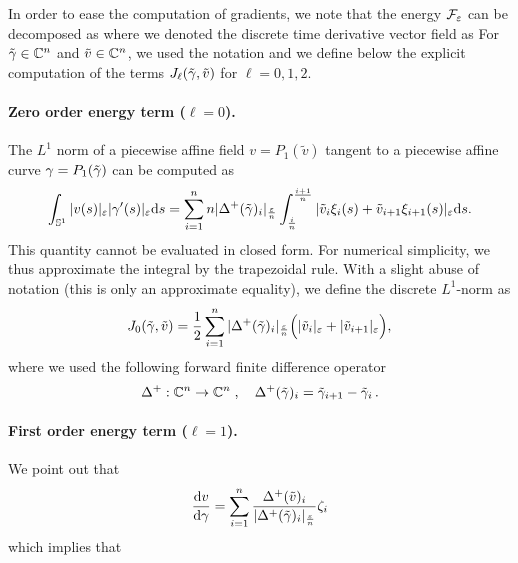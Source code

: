 In order to ease the computation of gradients, we note that the energy $\mathcal{F}_\varepsilon$ can be decomposed as
where we denoted the discrete time derivative vector field as
For $\tilde {\gamma} \in \mathbb{C}^n$ and $\tilde v \in \mathbb{C}^n$, we used the notation
and we define below the explicit computation of the terms $J_\ell(\tilde {\gamma}, \tilde v)$ for $\ell=0, 1, 2$.


\paragraph{Zero order energy term ($\ell=0$).}

The $L^1$ norm of a piecewise affine field $v = P_1(\tilde v)$ tangent to a piecewise affine curve $\gamma = P_1(\tilde{\gamma})$ can be computed as 
$$
	\int_{\mathbb{S}^1} |v(s)|_\varepsilon |\gamma'(s)|_\varepsilon\mathrm{d} s = 
	\sum_{i=1}^n n|\Delta^+(\tilde{\gamma})_i|_{\frac{\varepsilon}{n}}\int_{\frac i n}^{\frac{i+1}{n}}|\tilde v_i\xi_i(s) + \tilde v_{i+1}\xi_{i+1}(s)|_\varepsilon \mathrm{d} s.
$$
This quantity cannot be evaluated in closed form. For numerical simplicity, we thus approximate the integral by the trapezoidal rule. With a slight abuse of notation (this is only an approximate equality),  we define the discrete $L^1$-norm as
$$	
	J_0(\tilde{\gamma},\tilde{v}) = \frac{1}{2} 
	\sum_{i=1}^n |\Delta^+(\tilde{\gamma})_i|_{\frac{\varepsilon}{n}}
		\Big(|\tilde v_i|_{\varepsilon}+|\tilde v_{i+1}|_{\varepsilon}\Big),
$$
where we used the following forward finite difference operator
\begin{equation*}
	\Delta^+: \mathbb{C}^n\rightarrow  \mathbb{C}^n \;, \quad \Delta^+( \tilde{\gamma} )_i = \tilde{\gamma}_{i+1} - \tilde{\gamma}_i\,.
\end{equation*} 


\paragraph{First order energy term ($\ell=1$).}

We point out that 
\begin{equation}\label{first-discrete}
\frac{\mathrm{d} v}{\mathrm{d} \gamma} = \sum_{i=1}^n  \frac{\Delta^+(\tilde v)_i}{|\Delta^+(\tilde{\gamma})_i|_{\frac{\varepsilon}{n}}}\zeta_i 
\end{equation}
which implies that 

